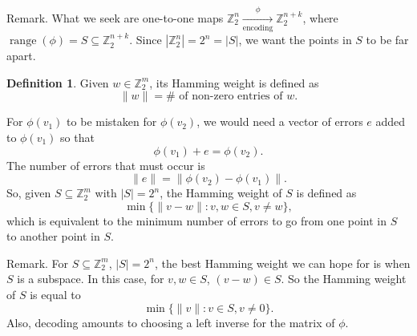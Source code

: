 \documentclass[12pt]{article}
\theoremstyle{definition}
\newtheorem*{definition}{Definition}
\newcommand{\Z}{\mathbb{Z}}
\begin{document}
Remark. What we seek are one-to-one maps $\Z_2^n \xrightarrow[\text{encoding}]\phi \Z_2^{n+k}$, where $\operatorname{range}(\phi)=S \subseteq \Z_2^{n+k}$. Since $|\Z_2^n|=2^n=|S|$, we want the points in $S$ to be far apart.

\begin{definition}
Given $w \in \Z_2^m$, its Hamming weight is defined as
\[
\|w\| = \#\text{ of non-zero entries of }w.
\]
\end{definition}
For $\phi(v_1)$ to be mistaken for $\phi(v_2)$, we would need a vector of errors $e$ added to $\phi(v_1)$ so that
\[
\phi(v_1)+e=\phi(v_2).
\]
The number of errors that must occur is
\[
\|e\| = \|\phi(v_2)-\phi(v_1)\|.
\]
So, given $S \subseteq \Z_2^m$ with $|S|=2^n$, the Hamming weight of $S$ is defined as
\[
\min\{\|v-w\| : v,w \in S, v \neq w\},
\]
which is equivalent to the minimum number of errors to go from one point in $S$ to another point in $S$.

Remark. For $S \subseteq \Z_2^m$, $|S|=2^n$, the best Hamming weight we can hope for is when $S$ is a subspace. In this case, for $v,w \in S$, $(v-w) \in S$. So the Hamming weight of $S$ is equal to
\[
\min\{\|v\| : v \in S, v \neq 0\}.
\]
Also, decoding amounts to choosing a left inverse for the matrix of $\phi$.
\end{document}
